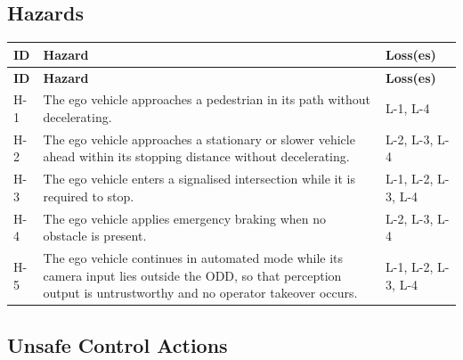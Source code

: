 \documentclass[a4paper,12pt]{article}
\begin{document}
\subsection{Hazards}

{\small
\begin{longtable}{@{}P{0.9cm}P{11.6cm}P{2.5cm}@{}}
\toprule
\textbf{ID} & \textbf{Hazard} & \textbf{Loss(es)} \\
\midrule
\endfirsthead
\toprule
\textbf{ID} & \textbf{Hazard} & \textbf{Loss(es)} \\
\midrule
\endhead
\bottomrule
\endlastfoot
H-1 & The ego vehicle approaches a pedestrian in its path without decelerating.
    & L-1, L-4 \\
H-2 & The ego vehicle approaches a stationary or slower vehicle ahead within its stopping
      distance without decelerating.
    & L-2, L-3, L-4 \\
H-3 & The ego vehicle enters a signalised intersection while it is required to stop.
    & L-1, L-2, L-3, L-4 \\
H-4 & The ego vehicle applies emergency braking when no obstacle is present.
    & L-2, L-3, L-4 \\
H-5 & The ego vehicle continues in automated mode while its camera input lies outside the
      ODD, so that perception output is untrustworthy and no operator takeover occurs.
    & L-1, L-2, L-3, L-4 \\
\end{longtable}}

\subsection{Unsafe Control Actions}
\end{document}
